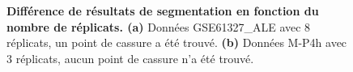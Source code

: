 \documentclass[12pt,a4paper]{report}
\begin{document}
\chapter{}
\label{annexeReplicats}
\begin{figure}[h!]
\centering
{}
\caption{\textbf{Différence de résultats de segmentation en fonction du nombre de réplicats. (a)} Données GSE61327\_ALE avec 8 réplicats, un point de cassure a été trouvé. \textbf{(b)} Données M-P4h avec 3 réplicats, aucun point de cassure n'a été trouvé.} 
\end{figure}
\end{document}
